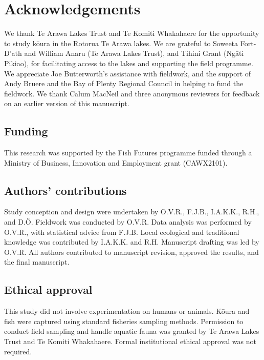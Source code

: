 \documentclass[
  letterpaper,
  DIV=11,
  numbers=noendperiod]{scrartcl}
\begin{document}
\section{Acknowledgements}\label{acknowledgements}

We thank Te Arawa Lakes Trust and Te Komiti Whakahaere for the
opportunity to study kōura in the Rotorua Te Arawa lakes. We are
grateful to Soweeta Fort-D'ath and William Anaru (Te Arawa Lakes Trust),
and Tihini Grant (Ngāti Pikiao), for facilitating access to the lakes
and supporting the field programme. We appreciate Joe Butterworth's
assistance with fieldwork, and the support of Andy Bruere and the Bay of
Plenty Regional Council in helping to fund the fieldwork. We thank Calum
MacNeil and three anonymous reviewers for feedback on an earlier version
of this manuscript.

\subsection{Funding}\label{funding}

This research was supported by the Fish Futures programme funded through
a Ministry of Business, Innovation and Employment grant (CAWX2101).

\subsection{Authors' contributions}\label{authors-contributions}

Study conception and design were undertaken by O.V.R., F.J.B., I.A.K.K.,
R.H., and D.Ö. Fieldwork was conducted by O.V.R. Data analysis was
performed by O.V.R., with statistical advice from F.J.B. Local
ecological and traditional knowledge was contributed by I.A.K.K. and
R.H. Manuscript drafting was led by O.V.R. All authors contributed to
manuscript revision, approved the results, and the final manuscript.

\subsection{Ethical approval}\label{ethical-approval}

This study did not involve experimentation on humans or animals. Kōura
and fish were captured using standard fisheries sampling methods.
Permission to conduct field sampling and handle aquatic fauna was
granted by Te Arawa Lakes Trust and Te Komiti Whakahaere. Formal
institutional ethical approval was not required.
\end{document}
